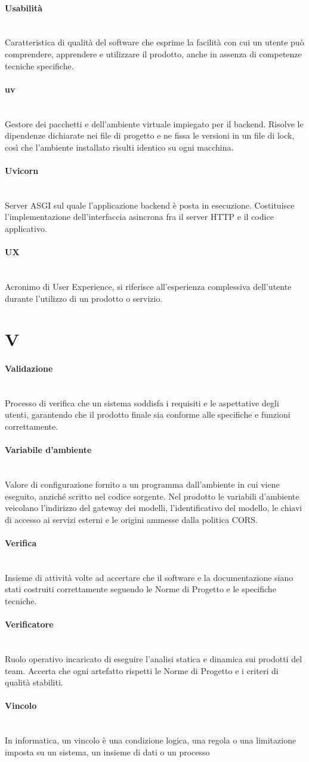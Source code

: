 \documentclass[a4paper, 10pt, colorlinks=true, linkcolor=black, urlcolor=blue, citecolor=blue, hidelinks]{article}
\newcommand{\glossaryterm}[2]{
    \paragraph{#1 \label{term:#1}} \mbox{} \\
    #2
    \vspace{0.5em}
}
\begin{document}
\glossaryterm{Usabilità}{Caratteristica di qualità del software che esprime la facilità con cui un utente può comprendere, apprendere e utilizzare il prodotto, anche in assenza di competenze tecniche specifiche.}

\glossaryterm{uv}{Gestore dei pacchetti e dell'ambiente virtuale impiegato per il backend. Risolve le dipendenze dichiarate nei file di progetto e ne fissa le versioni in un file di lock, così che l'ambiente installato risulti identico su ogni macchina.}

\glossaryterm{Uvicorn}{Server ASGI sul quale l'applicazione backend è posta in esecuzione. Costituisce l'implementazione dell'interfaccia asincrona fra il server HTTP e il codice applicativo.}

\glossaryterm{UX}{Acronimo di User Experience, si riferisce all'esperienza complessiva dell'utente durante l'utilizzo di un prodotto o servizio.}

\newpage

\section*{V}

\glossaryterm{Validazione}{Processo di verifica che un sistema soddisfa i requisiti e le aspettative degli utenti, garantendo che il prodotto finale sia conforme alle specifiche e funzioni correttamente.}

\glossaryterm{Variabile d'ambiente}{Valore di configurazione fornito a un programma dall'ambiente in cui viene eseguito, anziché scritto nel codice sorgente. Nel prodotto le variabili d'ambiente veicolano l'indirizzo del gateway dei modelli, l'identificativo del modello, le chiavi di accesso ai servizi esterni e le origini ammesse dalla politica CORS.}

\glossaryterm{Verifica}{Insieme di attività volte ad accertare che il software e la documentazione siano stati costruiti correttamente seguendo le Norme di Progetto e le specifiche tecniche.}

\glossaryterm{Verificatore}{Ruolo operativo incaricato di eseguire l'analisi statica e dinamica sui prodotti del team. Accerta che ogni artefatto rispetti le Norme di Progetto e i criteri di qualità stabiliti.}

\glossaryterm{Vincolo}{In informatica, un vincolo è una condizione logica, una regola o una limitazione imposta su un sistema, un insieme di dati o un processo}
\end{document}
